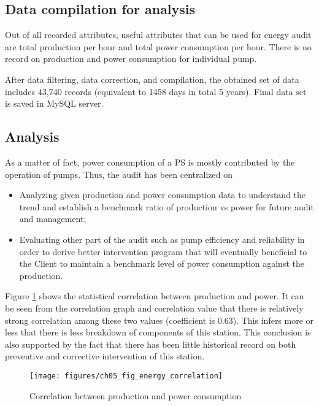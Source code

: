 \subsection{Data compilation for analysis}
Out of all recorded attributes, useful attributes that can be used for energy audit are total production per hour and total power consumption per hour. There is no record on production and power consumption for individual pump.

After data filtering, data correction, and compilation, the obtained set of data includes 43,740 records (equivalent to 1458 days in total 5 years). Final data set is saved in MySQL server.

\subsection{Analysis}

As a matter of fact, power consumption of a PS is mostly contributed by the operation of pumps. Thus, the audit has been centralized on 
\begin{itemize}
	\item Analyzing given production and power consumption data to understand the trend and establish a benchmark ratio of production vs power for future audit and management;
	\item Evaluating other part of the audit such as pump efficiency and reliability in order to derive better intervention program that will eventually beneficial to the Client to maintain a benchmark level of power consumption against the production. 
\end{itemize}

Figure \ref{ch05_fig_energy_correlation} shows the statistical correlation between production and power. It can be seen from the correlation graph and correlation value that there is relatively strong correlation among these two values (coefficient is 0.63). This infers more or less that there is less breakdown of components of this station. This conclusion is also supported by the fact that there has been little historical record on both preventive and corrective intervention of this station.

\begin{figure}[!htb]
	\texttt{[image: figures/ch05\_fig\_energy\_correlation]} \\
	\caption{Correlation between production and power consumption}
	\label{ch05_fig_energy_correlation} 
\end{figure}

